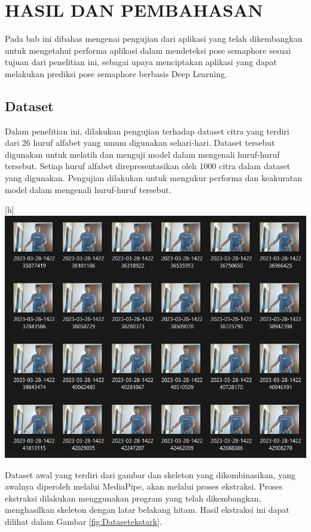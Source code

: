 \chapter{HASIL DAN PEMBAHASAN}
Pada bab ini dibahas mengenai pengujian dari aplikasi yang telah dikembangkan untuk mengetahui performa aplikasi dalam mendeteksi pose semaphore sesuai tujuan dari penelitian ini, sebagai upaya menciptakan aplikasi yang dapat melakukan prediksi pose semaphore berbasis Deep Learning.

\section{Dataset}
Dalam penelitian ini, dilakukan pengujian terhadap dataset citra yang terdiri dari 26 huruf alfabet yang umum digunakan sehari-hari. Dataset tersebut digunakan untuk melatih dan menguji model dalam mengenali huruf-huruf tersebut. Setiap huruf alfabet direpresentasikan oleh 1000 citra dalam dataset yang digunakan. Pengujian dilakukan untuk mengukur performa dan keakuratan model dalam mengenali huruf-huruf tersebut.

\begin{center}[h]
	\includegraphics[width=0.7\linewidth]{gambar/citra_dataset.png}
	\label{fig:Datasetraw}
\end{center}

Dataset awal yang terdiri dari gambar dan skeleton yang dikombinasikan, yang awalnya diperoleh melalui MediaPipe, akan melalui proses ekstraksi. Proses ekstraksi dilakukan menggunakan program yang telah dikembangkan, menghasilkan skeleton dengan latar belakang hitam. Hasil ekstraksi ini dapat dilihat dalam Gambar \ref{fig:Datasetekstark}.

